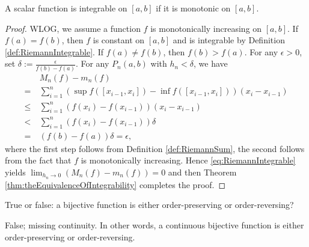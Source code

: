 \begin{thm}
  \label{thm:monotonicFuncIsIntegrable}
  A scalar function is integrable on $[a, b]$
   if it is monotonic on $[a, b]$.
\end{thm}
\begin{proof}
  WLOG, we assume a function $f$ is monotonically increasing on $[a,b]$.
  If $f(a)=f(b)$, then $f$ is constant on $[a,b]$ and is integrable
  by Definition \ref{def:RiemannIntegrable}. If $f(a)\neq f(b)$, then
  $f(b)>f(a)$.
  For any $\epsilon>0$, set $\delta:=\frac{\epsilon}{f(b)-f(a)}$.
  For any $P_{n}(a,b)$ with $h_{n}<\delta$, we have
  \begin{align*}
    &\ M_{n}(f)-m_{n}(f)\\
    =&\ \sum_{i=1}^{n}
      (\sup f([x_{i-1},x_{i}])-\inf f([x_{i-1},x_{i}]))(x_{i}-x_{i-1})\\
    \le &\ \sum_{i=1}^{n}(f(x_{i})-f(x_{i-1}))(x_{i}-x_{i-1})\\
    < &\ \sum_{i=1}^{n}(f(x_{i})-f(x_{i-1}))\delta\\
    = &\ (f(b)-f(a))\delta=\epsilon,
  \end{align*}
  where the first step follows from Definition \ref{def:RiemannSum},
  the second follows from the fact that $f$ is monotonically increasing.
  Hence \eqref{eq:RiemannIntegrable} yields
  $\lim_{h_{n}\rightarrow 0}(M_{n}(f)-m_{n}(f))=0$ and then
  Theorem \ref{thm:theEquivalenceOfIntegrability} completes the proof.
\end{proof}

\begin{exc}
  True or false:
   a bijective function is either order-preserving
    or order-reversing?
\end{exc}
\begin{solution}
  False; missing continuity.
  In other words,
   a continuous bijective function is either order-preserving
    or order-reversing.
\end{solution}

